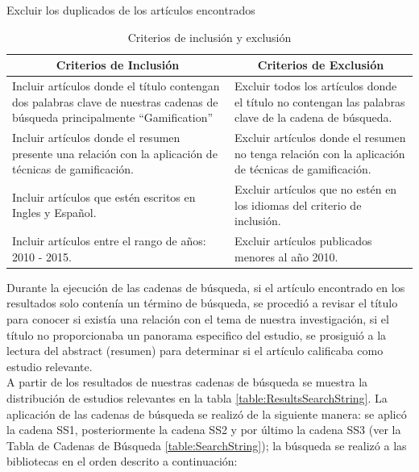 \documentclass{report}
\begin{document}
    	    Excluir los duplicados de los artículos encontrados
        	\begin{table}
                \begin{center}
                    \caption{Criterios de inclusión y exclusión}
                    \label{table:criterios}
                    \begin{tabular}{| p{7cm} | p{7cm} |}
                        \toprule
                        \hline
                        \multicolumn{1}{|c|}{\textbf{Criterios de Inclusión}} & \multicolumn{1}{|c|}{\textbf{Criterios de Exclusión}} \\
                        \hline
                        Incluir artículos donde el título contengan dos palabras clave de nuestras cadenas de búsqueda principalmente ``Gamification''{ }& Excluir todos los artículos donde el título no contengan las palabras clave de la cadena de búsqueda.\\
                        \hline
                        Incluir artículos donde el resumen presente una relación con la aplicación de técnicas de gamificación. & Excluir artículos donde el resumen no tenga relación con la aplicación de técnicas de gamificación.\\
                        \hline
                        Incluir artículos que estén escritos en Ingles y Español. & Excluir artículos que no estén en los idiomas del criterio de inclusión.\\ \hline
                        Incluir artículos entre el rango de años: 2010 - 2015. & Excluir artículos publicados menores al año 2010.\\
                        \hline
                    \end{tabular}
                \end{center}
            \end{table}
            Durante la ejecución de las cadenas de búsqueda, si el artículo encontrado en los resultados solo contenía un término de búsqueda, se procedió a revisar el título para conocer si existía una relación con el tema de nuestra investigación, si el título no proporcionaba un panorama especifico del estudio, se prosiguió a la lectura del abstract (resumen) para determinar si el artículo calificaba como estudio relevante.\\
            A partir de los resultados de nuestras cadenas de búsqueda se muestra la distribución de estudios relevantes en la tabla \ref{table:ResultsSearchString}. La aplicación de las cadenas de búsqueda se realizó de la siguiente manera: se aplicó la cadena SS1, posteriormente la cadena SS2 y por último la cadena SS3 (ver la Tabla de Cadenas de Búsqueda \ref{table:SearchString}); la búsqueda se realizó a las bibliotecas en el orden descrito a continuación:
\end{document}
